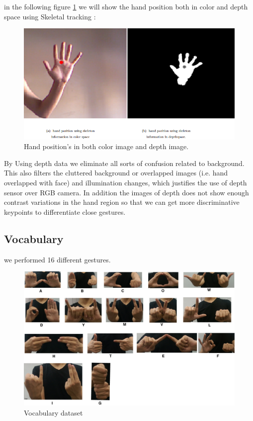 in the following figure \ref{fig:cam9} we will show the hand position both in color and depth space using Skeletal tracking  :

\begin{figure}[H]
\centering
\includegraphics[width= 1.0\textwidth]{img/colorvsdepth.PNG}

\caption {Hand position's in both color image and depth image.
\label{fig:cam9}}
\end{figure}


By Using depth data   we eliminate all
sorts of confusion related to background. This also filters the cluttered background or overlapped images (i.e. hand overlapped with face) and illumination changes,  which justifies the use of depth sensor over RGB camera. In addition  the images of depth does not show enough contrast variations  in the hand region  so that we can get more discriminative keypoints to differentiate close gestures. 

\subsection{Vocabulary}
we performed 16 different gestures.

\begin{figure}[H]
\centering
\includegraphics[width=1.0\textwidth]{img/vocab.pdf}
\caption{ Vocabulary dataset  }
\label{fig:vocab}
\end{figure}


